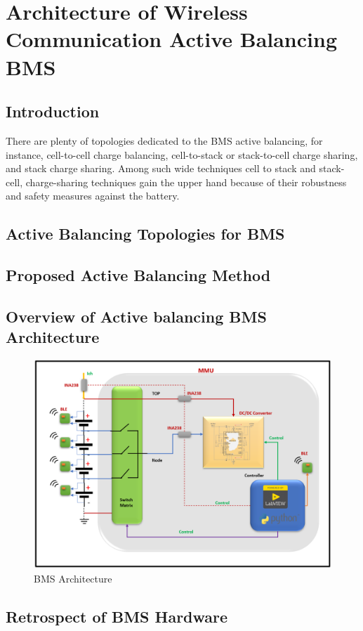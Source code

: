 \chapter{Architecture of Wireless Communication Active Balancing BMS}\label{ch:Architecture_Active_Balancing_BMS}
\section{Introduction}
There are plenty of topologies dedicated to the BMS active balancing, for instance, cell-to-cell charge balancing, cell-to-stack or stack-to-cell charge sharing, and stack charge sharing. Among such wide techniques cell to stack and stack-cell, charge-sharing techniques gain the upper hand because of their robustness and safety measures against the battery.
\section{Active Balancing Topologies for BMS }

\section{Proposed Active Balancing Method}
\section{Overview of Active balancing BMS Architecture}
\begin{figure}[h]
	\centering
	\includegraphics[width=1\textwidth]{Chap04/Figures/BMS_Architecture_border.PNG}
	\caption{BMS Architecture} 
	\label{fig:BMS Architecture}
\end{figure}
\section{Retrospect of BMS Hardware}




